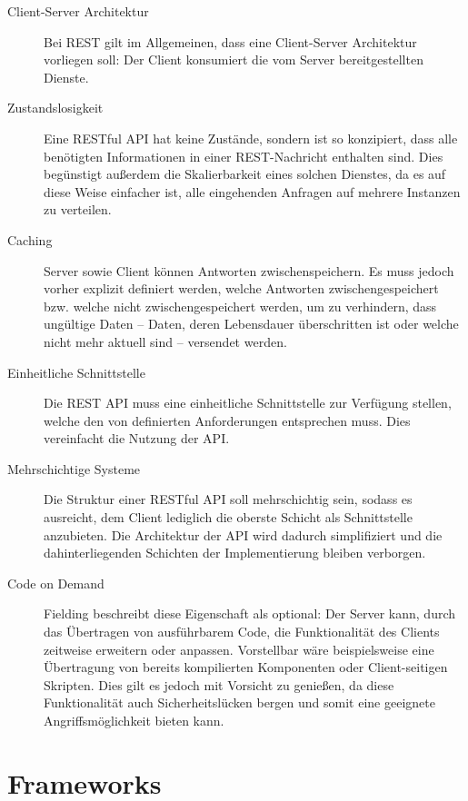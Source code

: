 		\begin{description}
			\item[Client-Server Architektur] 
				Bei \acs{REST} gilt im Allgemeinen, dass eine Client-Server Architektur vorliegen soll: Der Client konsumiert die vom Server bereitgestellten Dienste. 
			\item[Zustandslosigkeit] 
				Eine RESTful \acs{API} hat keine Zustände, sondern ist so konzipiert, dass alle benötigten Informationen in einer REST-Nachricht enthalten sind. Dies begünstigt außerdem die Skalierbarkeit eines solchen Dienstes, da es auf diese Weise einfacher ist, alle eingehenden Anfragen auf mehrere Instanzen zu verteilen.
			\item[Caching] 
				Server sowie Client können Antworten zwischenspeichern. Es muss jedoch vorher explizit definiert werden, welche Antworten zwischengespeichert bzw. welche nicht zwischengespeichert werden, um zu verhindern, dass ungültige Daten -- Daten, deren Lebensdauer überschritten ist oder welche nicht mehr aktuell sind -- versendet werden.
			\item[Einheitliche Schnittstelle]
				Die \acs{REST} \acs{API} muss eine einheitliche Schnittstelle zur Verfügung stellen, welche den von \cite{Fielding.2000} definierten Anforderungen entsprechen muss. Dies vereinfacht die Nutzung der \acs{API}.
			\item[Mehrschichtige Systeme]
				 Die Struktur einer RESTful \acs{API} soll mehrschichtig sein, sodass es ausreicht, dem Client lediglich die oberste Schicht als Schnittstelle anzubieten. Die Architektur der API wird dadurch simplifiziert und die dahinterliegenden Schichten der Implementierung bleiben verborgen.
			\item[Code on Demand] 
				Fielding beschreibt diese Eigenschaft als optional: Der Server kann, durch das Übertragen von ausführbarem Code, die Funktionalität des Clients zeitweise erweitern oder anpassen. Vorstellbar wäre beispielsweise eine Übertragung von bereits kompilierten Komponenten oder Client-seitigen Skripten. Dies gilt es jedoch mit Vorsicht zu genießen, da diese Funktionalität auch Sicherheitslücken bergen und somit eine geeignete Angriffsmöglichkeit bieten kann. 
				
		\end{description}

	\section{Frameworks}\label{sec:frameworks}
	
